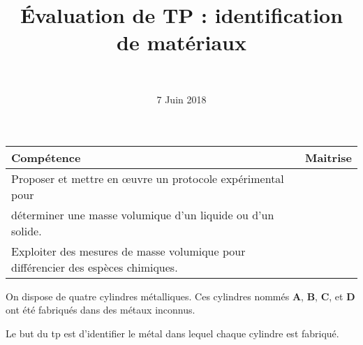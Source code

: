 \documentclass[a4paper,11pt]{exam}
\author{\ }
\date{7 Juin 2018}
\title{\'Evaluation de TP : identification de matériaux}
\begin{document}
%	
\maketitle
	
\begin{small}
	\begin{center}
		\begin{tabular}{|@{\ }l@{}|@{\ }c@{\ }|}
			\hline
			\textbf{Compétence} & \textbf{Maitrise} \\
			\hline
				Proposer et mettre en \oe uvre un protocole expérimental pour & \\ déterminer une masse volumique d’un liquide ou d’un solide.\ &  \ \ \ \\
			\hline
				Exploiter des mesures de masse volumique pour différencier des espèces chimiques.\ &  \ \ \ \\
			\hline	
		\end{tabular}
	\end{center}
\end{small}	

On dispose de quatre cylindres métalliques. Ces cylindres nommés $\mathbf{A}$, $\mathbf{B}$, $\mathbf{C}$, et $\mathbf{D}$ ont été fabriqués dans des métaux inconnus.

Le but du tp est d'identifier le métal dans lequel chaque cylindre est fabriqué.
\end{document}

